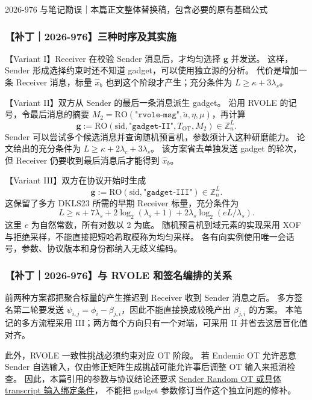 \begin{patchnote}{2026-976 与笔记勘误｜本篇正文整体替换稿，包含必要的原有基础公式}
\subsubsection{【补丁｜2026-976】三种时序及其实施}

【Variant I】Receiver 在校验 Sender 消息后，才均匀选择 $\boldsymbol g$ 并发送。
这样，Sender 形成选择约束时还不知道 gadget，可以使用独立源的分析。
代价是增加一条 Receiver 消息，标量 $\hat x_b$ 也到这个阶段才产生；充分条件为
$L\ge\kappa+3\lambda_s$。

【Variant II】双方从 Sender 的最后一条消息派生 gadget。
沿用 RVOLE 的记号，令最后消息的摘要 $M_2=\mathrm{RO}(\texttt{"rvole-msg"},\tilde a,\eta,\mu)$，再计算
\begin{equation}
\boldsymbol g:=\mathrm{RO}(\mathrm{sid},\texttt{"gadget-II"},T_{\mathrm{OT}},M_2)
  \in \mathbb Z_n^L.
\end{equation}
Sender 可以尝试多个候选消息并查询随机预言机，参数须计入这种研磨能力。
论文给出的充分条件为 $L\ge\kappa+2\lambda_c+3\lambda_s$。
该方案省去单独发送 gadget 的轮次，但 Receiver 仍要收到最后消息后才能得到 $\hat x_b$。

【Variant III】双方在协议开始时生成
\begin{equation}\label{eq:misc-gadget:gvec}
\boldsymbol g:=\mathrm{RO}(\mathrm{sid},\texttt{"gadget-III"})
  \in \mathbb Z_n^L.
\end{equation}
这保留了多方 DKLS23 所需的早期 Receiver 标量，充分条件为
\begin{equation}
L\ge\kappa+7\lambda_s+2\log_2(\lambda_s+1)
       +2\lambda_s\log_2(eL/\lambda_s).
\end{equation}
这里 $e$ 为自然常数，所有对数以 2 为底。
随机预言机到域元素的实现采用 XOF 与拒绝采样，不能直接把短哈希取模称为均匀采样。
各有向实例使用唯一会话号，参数、协议版本和身份都纳入无歧义编码。

\subsubsection{【补丁｜2026-976】与 RVOLE 和签名编排的关系}

前两种方案都把聚合标量的产生推迟到 Receiver 收到 Sender 消息之后。
多方签名第二轮要发送 $\psi_{i,j}=\phi_i-\beta_{j,i}$，因此不能直接换成较晚产出 $\beta_{j,i}$ 的方案。
本笔记的多方流程采用 III；两方每个方向只有一个对端，可采用 II 并省去这层盲化值对齐。

此外，RVOLE 一致性挑战必须约束对应 OT 阶段。
若 Endemic OT 允许恶意 Sender 自选输入，仅由修正矩阵生成挑战可能允许事后调整 OT 输入来抵消检查。
因此，本篇引用的参数与协议结论还要求
\hyperref[sec:rvole:parameters-model]{Sender Random OT 或具体 transcript 输入绑定条件}，
不能把 gadget 参数修订当作这个独立问题的修补。


\end{patchnote}
